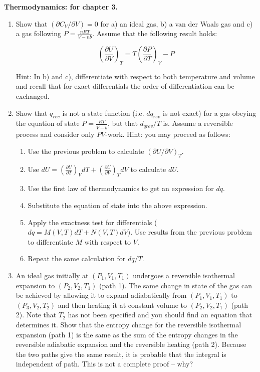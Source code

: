 \noindent
\textbf{Thermodynamics:
 for chapter 3.}\\

\begin{enumerate}

\item Show that $(\partial C_V / \partial V) = 0$ for a) an ideal gas, b) a van der Waals gas and c) a gas following $P = \frac{nRT}{V - nb}$. Assume that the following result holds:

$$\left(\frac{\partial U}{\partial V}\right)_T = T\left(\frac{\partial P}{\partial T}\right)_V - P$$

Hint: In b) and c), differentiate with respect to both temperature and volume and recall that for exact differentials the order of differentiation can be exchanged.


\item Show that $q_{rev}$ is not a state function (i.e. $dq_{rev}$ is not exact) for a gas obeying the equation of state $P = \frac{RT}{\bar{V} - b}$, but that $d_{qrev} / T$ is. Assume a reversible process and consider only $PV$-work. Hint: you may proceed as follows:

\begin{enumerate}
\item Use the previous problem to calculate $\left(\partial U / \partial V\right)_T$.
\item Use $dU = \left(\frac{\partial U}{\partial T}\right)_VdT + \left(\frac{\partial U}{\partial V}\right)_TdV$ to calculate $dU$.
\item Use the first law of thermodynamics to get an expression for $dq$.
\item Substitute the equation of state into the above expression.
\item Apply the exactness test for differentials ($dq = M(V,T)dT + N(V,T)dV$). Use results from the previous problem to differentiate $M$ with respect to $V$.
\item Repeat the same calculation for $dq/T$.
\end{enumerate}


\item An ideal gas initially at $(P_1, V_1, T_1)$ undergoes a reversible isothermal expansion to $(P_2, V_2, T_1)$ (path 1). The same change in state of the gas can be achieved by allowing it to expand adiabatically from $(P_1, V_1, T_1)$ to $(P_3, V_2, T_2)$ and then heating it at constant volume to $(P_2, V_2, T_1)$ (path 2). Note that $T_2$ has not been specified and you should find an equation that determines it. Show that the entropy change for the reversible isothermal expansion (path 1) is the same as the sum of the entropy changes in the reversible adiabatic expansion and the reversible heating (path 2). Because the two paths give the same result, it is probable that the integral is independent of path. This is not a complete proof -- why?


\end{enumerate}
